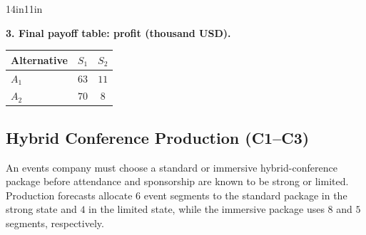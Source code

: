 \begin{CalculationLandscape}{14in}{11in}

\noindent\begin{minipage}{\linewidth}
\textbf{3. Final payoff table: profit (thousand USD).}
\begin{center}
\begin{tabular}{@{}lcc@{}}
\toprule
Alternative & \(S_1\) & \(S_2\) \\
\midrule
\(A_1\) & \(63\) & \(11\) \\
\(A_2\) & \(70\) & \(8\) \\
\bottomrule
\end{tabular}
\end{center}
\end{minipage}



\end{CalculationLandscape}


	\subsection{Hybrid Conference Production (C1--C3)}
	\label{sec:problem17-hybrid-conference-production-c1-c3}

	An events company must choose a standard or immersive hybrid-conference package before attendance and sponsorship are known to be strong or limited. Production forecasts allocate \(6\) event segments to the standard package in the strong state and \(4\) in the limited state, while the immersive package uses \(8\) and \(5\) segments, respectively.

